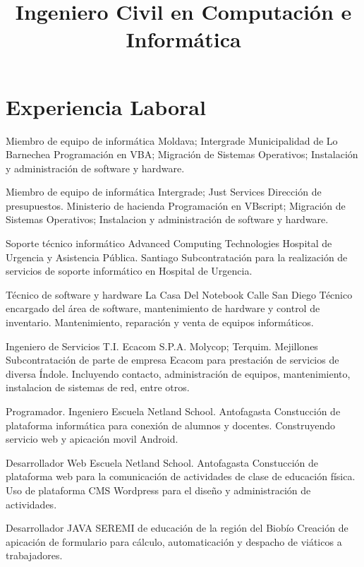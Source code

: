 \documentclass[draft,color,12pt,letterpaper,sans]{moderncv}
\title{Ingeniero Civil en Computaci\'on e Inform\'atica}
\begin{document}
\makecvtitle %

\section{Experiencia Laboral}
{Miembro de equipo de inform\'atica}
{Moldava; Intergrade}
{Municipalidad de Lo Barnechea}
{}
{Programaci\'on en VBA; Migraci\'on de Sistemas Operativos; Instalaci\'on y administraci\'on de software y hardware.}

{Miembro de equipo de inform\'atica}
{Intergrade; Just Services}
{Direcci\'on de presupuestos. Ministerio de hacienda}
{}
{Programaci\'on en VBscript; Migraci\'on de Sistemas Operativos; Instalacion y administraci\'on de software y hardware.}

{Soporte t\'ecnico inform\'atico}
{Advanced Computing Technologies}
{Hospital de Urgencia y Asistencia P\'ublica. Santiago}
{}
{Subcontrataci\'on para la realizaci\'on de servicios de soporte inform\'atico en Hospital de Urgencia.}

{T\'ecnico de software y hardware}
{La Casa Del Notebook}
{Calle San Diego}
{}
{T\'ecnico encargado del \'area de software, mantenimiento de hardware y control de inventario. Mantenimiento, reparaci\'on y venta de equipos inform\'aticos.} 

{Ingeniero de Servicios T.I.}
{Ecacom S.P.A.}
{Molycop; Terquim. Mejillones}
{}
{Subcontrataci\'on de parte de empresa Ecacom para prestaci\'on de servicios de diversa \'Indole. Incluyendo contacto, administración de equipos, mantenimiento, instalacion de sistemas de red, entre otros.}

{Programador. Ingeniero}
{Escuela Netland School. Antofagasta}
{}
{}
{Constucci\'on de plataforma inform\'atica para conexi\'on de alumnos y docentes. Construyendo servicio web y apicaci\'on movil Android.}

{Desarrollador Web}
{Escuela Netland School. Antofagasta}
{}
{}
{Constucci\'on de plataforma web para la comunicaci\'on de actividades de clase de educaci\'on f\'isica. Uso de plataforma CMS Wordpress para el dise\~no y administraci\'on de actividades.}

{Desarrollador JAVA}
{SEREMI de educación de la región del Biobío}
{}
{}
{Creaci\'on de apicaci\'on de formulario para c\'alculo, automaticaci\'on y despacho de vi\'aticos a trabajadores.}
\end{document}
